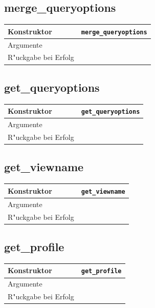 \documentclass[11pt, twoside, a4paper, BCOR8mm, DIV12, bibtotoc,idxtotoc]{scrbook}
\begin{document}
\subsection{merge\_queryoptions}
\begin{shadowenv}
\begin{tabular}{lp{10cm}}
  Konstruktor & \texttt{merge\_queryoptions}\\
  \hline
  Argumente     & \\
  R"uckgabe bei Erfolg & \\
\end{tabular}
\end{shadowenv}

\subsection{get\_queryoptions}
\begin{shadowenv}
\begin{tabular}{lp{10cm}}
  Konstruktor & \texttt{get\_queryoptions}\\
  \hline
  Argumente     & \\
  R"uckgabe bei Erfolg & \\
\end{tabular}
\end{shadowenv}

\subsection{get\_viewname}
\begin{shadowenv}
\begin{tabular}{lp{10cm}}
  Konstruktor & \texttt{get\_viewname}\\
  \hline
  Argumente     & \\
  R"uckgabe bei Erfolg & \\
\end{tabular}
\end{shadowenv}

\subsection{get\_profile}
\begin{shadowenv}
\begin{tabular}{lp{10cm}}
  Konstruktor & \texttt{get\_profile}\\
  \hline
  Argumente     & \\
  R"uckgabe bei Erfolg & \\
\end{tabular}
\end{shadowenv}
\end{document}
